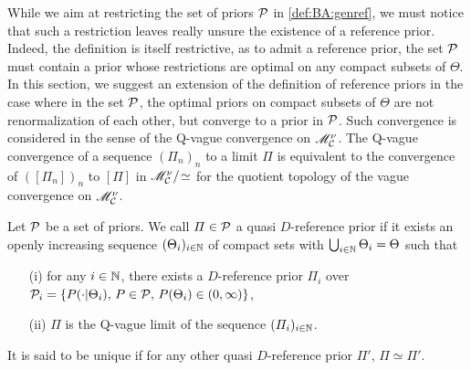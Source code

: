 
While we aim at restricting the set of priors $\mathcal{P}$ in \cref{def:BA:genref}, we must notice
that such a restriction leaves really unsure the existence of a reference prior. 
Indeed, the definition is itself restrictive, as to admit a reference prior, the set $\mathcal{P}$ must contain a prior whose restrictions are optimal on any compact subsets of $\Theta$.
In this section, we suggest an extension of the definition of reference priors in the case where in the set $\mathcal{P}$, the optimal priors on compact subsets of $\Theta$ are not renormalization of each other, but converge to a  prior in $\mathcal{P}$. 
Such convergence is considered in the sense of the Q-vague convergence \citep{bioche_approximation_2016} on $\mathscr{M}^\nu_{\mathcal{C}}$. %
The Q-vague convergence of a sequence $(\varPi_n)_n$ to a limit $\varPi$ is equivalent to the convergence of $([\varPi_n])_n$ to $[\varPi]$ in $\mathscr{M}^\nu_{\mathcal{C}}/\!\simeq$ for the quotient topology of the vague convergence on $\mathscr{M}^\nu_{\mathcal{C}}$.




\begin{defi}\label{defi:quasiRefprior}
    Let $\mathcal{P}$ be a set of priors. We call $\varPi\in\mathcal{P}$ a quasi $D$-reference prior if it exists an openly increasing sequence $(\Theta_i)_{i\in \mathbb{N}}$  of compact sets with $\bigcup_{i\in\mathbb{N}}\Theta_i=\Theta$ such that
    \begin{itemize}
        \item[(i)] for any $i\in \mathbb{N}$, there exists a $D$-reference prior $\varPi_i$ over $\mathcal{P}_i=\{P(\cdot|\Theta_i),\, P\in\mathcal{P},\,P(\Theta_i)\in(0,\infty) \}$, %
        \item[(ii)] $\varPi$ is the Q-vague limit of the sequence $(\varPi_i)_{i\in \mathbb{N}}$.
    \end{itemize}
    It is said to be unique  if for any other quasi $D$-reference prior $\varPi'$, $\varPi\simeq\varPi'$.
\end{defi}

